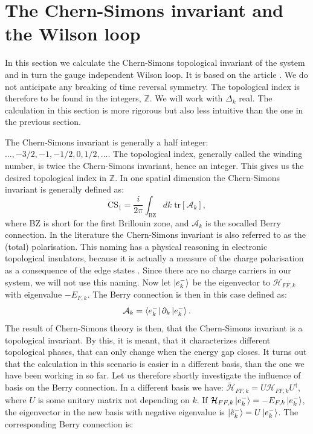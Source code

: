 \section{The Chern-Simons invariant and the Wilson loop}
\label{sec.CS1}
In this section we calculate the Chern-Simons topological invariant of the system and in turn the gauge independent Wilson loop. It is based on the article \cite{Ryu.Topology}. We do not anticipate any breaking of time reversal symmetry. The topological index is therefore to be found in the integers, $\mathbb{Z}$. We will work with $\Delta_k$ real. The calculation in this section is more rigorous but also less intuitive than the one in the previous section.

The Chern-Simons invariant is generally a half integer: $\dots, -3/2, -1, -1/2, 0, 1/2, \dots$. The topological index, generally called the winding number, is twice the Chern-Simons invariant, hence an integer. This gives us the desired topological index in $\mathbb{Z}$. In one spatial dimension the Chern-Simons invariant is generally defined as:
\begin{equation}
\text{CS}_1 = \frac{i}{2\pi}\int_{\text{BZ}}dk \; \text{tr}\left[\mathcal{A}_k\right], \nonumber
\end{equation}
where BZ is short for the first Brillouin zone, and $\mathcal{A}_k$ is the socalled Berry connection. In the literature the Chern-Simons invariant is also referred to as the (total) polarisation. This naming has a physical reasoning in electronic topological insulators, because it is actually a measure of the charge polarisation as a consequence of the edge states \cite{FuKane2006}. Since there are no charge carriers in our system, we will not use this naming. Now let $\ket{e^{-}_k}$ be the eigenvector to $\mathcal{H}_{FF,k}$ with eigenvalue $-E_{F,k}$. The Berry connection is then in this case defined as:
\begin{equation}
\mathcal{A}_k = \bra{e^{-}_k}\partial_k\ket{e^{-}_k}. \nonumber
\end{equation}
The result of Chern-Simons theory is then, that the Chern-Simons invariant is a topological invariant. By this, it is meant, that it characterizes different topological phases, that can only change when the energy gap closes. It turns out that the calculation in this scenario is easier in a different basis, than the one we have been working in so far. Let us therefore shortly investigate the influence of basis on the Berry connection. In a different basis we have: $\tilde{\mathcal{H}}_{FF,k} = U\mathcal{H}_{FF,k}U^\dagger$, where $U$ is some unitary matrix not depending on $k$. If $\mathcal{H}_{FF,k}\ket{e^{-}_k} = -E_{F,k}\ket{e^{-}_k}$, the eigenvector in the new basis with negative eigenvalue is $\ket{\tilde{e}^{-}_k} = U\ket{e^{-}_k}$. The corresponding Berry connection is:
